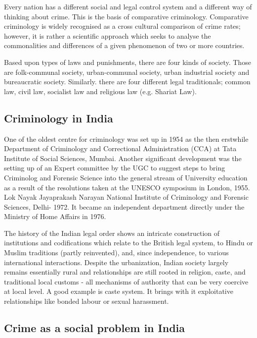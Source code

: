 \documentclass{article}
\begin{document}
Every nation has a different social and legal control system and a different way of thinking about crime. This is the basis of comparative criminology. Comparative criminology is widely recognised as a cross cultural comparison of crime rates; however, it is rather a scientific approach which seeks to analyse the commonalities and differences of a given phenomenon of two or more countries.

Based upon types of laws and punishments, there are four kinds of society. Those are folk-communal society, urban-communal society, urban industrial society and bureaucratic society. Similarly. there are four different legal traditionals; common law, civil law, socialist law and religious law (e.g. Shariat Law).

\subsection{Criminology in India}

One of the oldest centre for criminology was set up in 1954 as the then erstwhile Department of Criminology and Correctional Administration (CCA) at Tata Institute of Social Sciences, Mumbai. Another significant development was the setting up of an Expert committee by the UGC to suggest steps to bring Criminolog and Forensic Science into the general stream of University education as a result of the resolutions taken at the UNESCO symposium in London, 1955. Lok Nayak Jayaprakash Narayan National Institute of Criminology and Forensic Sciences, Delhi- 1972. It became an independent department directly under the Ministry of Home Affairs in 1976.

The history of the Indian legal order shows an intricate construction of institutions and codifications which relate to the British legal system, to Hindu or Muslim traditions (partly reinvented), and, since independence, to various international interactions. Despite the urbanization, Indian society largely remains essentially rural and relationships are still rooted in religion, caste, and traditional local customs - all mechanisms of authority that can be very coercive at local level. A good example is caste system. It brings with it exploitative relationships like bonded labour or sexual harassment.

\subsection{Crime as a social problem in India}
\end{document}
